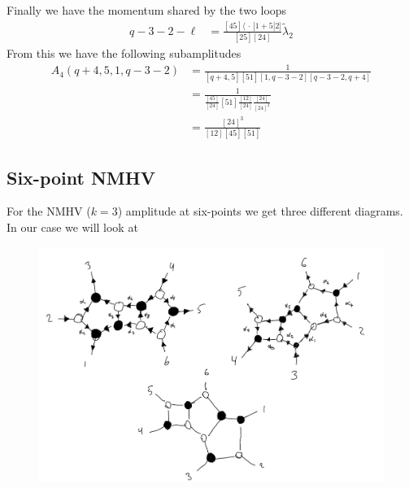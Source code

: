 \documentclass[letter,11pt]{article}
\newcommand{\aMs}[3]{\langle #1|#2|#3]}  		%
\begin{document}
Finally we have the momentum shared by the two loops
\begin{equation}
	\begin{aligned}
	q-3-2-\ell&=\frac{\left[45\right]\aMs{\,\cdot\,}{1+5}{2}}{\left[25\right]\left[24\right]}\tilde\lambda_2	
	\end{aligned}
\end{equation}
From this we have the following subamplitudes
\begin{equation}
	\begin{aligned}
		A_4(q+4,5,1,q-3-2)&=\frac{1}{\left[q+4,5\right]\left[51\right]\left[1,q-3-2\right]\left[q-3-2,q+4\right]}\\
		&=\frac{1}{\frac{\left[45\right]}{\left[24\right]}\left[51\right]\frac{\left[12\right]}{\left[24\right]}\frac{\left[24\right]}{\left[24\right]^2}}\\
		&=\frac{[24]^3}{[12]\left[45\right][51]}
	\end{aligned}
\end{equation}
\subsection{Six-point NMHV}
For the NMHV ($k=3$) amplitude at six-points we get three different diagrams. In our case we will look at
\begin{figure}[H]
	\centering
	\includegraphics[width=0.9\linewidth]{nmhv}
	\caption[]{}
	\label{fig:44}
\end{figure}
\end{document}
